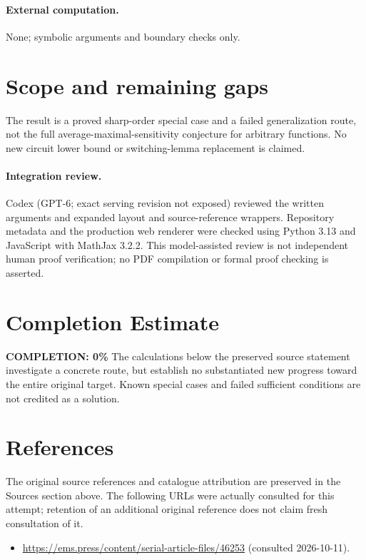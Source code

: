 \documentclass[11pt]{article}
\begin{document}
\paragraph{External computation.} None; symbolic arguments and boundary checks only.
\section{Scope and remaining gaps}
The result is a proved sharp-order special case and a failed generalization route, not the full average-maximal-sensitivity conjecture for arbitrary functions. No new circuit lower bound or switching-lemma replacement is claimed.
\paragraph{Integration review.} Codex (GPT-6; exact serving revision not exposed) reviewed the written arguments and expanded layout and source-reference wrappers. Repository metadata and the production web renderer were checked using Python 3.13 and JavaScript with MathJax 3.2.2. This model-assisted review is not independent human proof verification; no PDF compilation or formal proof checking is asserted.

\section{Completion Estimate}
\noindent\textbf{COMPLETION: 0\%}
The calculations below the preserved source statement investigate a concrete route,
but establish no substantiated new progress toward the entire original target.
Known special cases and failed sufficient conditions are not credited as a solution.
\section{References}
The original source references and catalogue attribution are preserved in the
Sources section above. The following URLs were actually consulted for this attempt;
retention of an additional original reference does not claim fresh consultation of it.
\begin{itemize}
\item \url{https://ems.press/content/serial-article-files/46253} (consulted 2026-10-11). 
\end{itemize}
\end{document}
